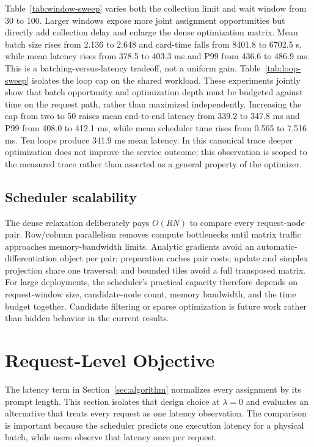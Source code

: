 \documentclass[10pt]{article}
\begin{document}
Table~\ref{tab:window-sweep} varies both the collection limit and wait window
from 30 to 100. Larger windows expose more joint assignment opportunities but
directly add collection delay and enlarge the dense optimization matrix. Mean
batch size rises from 2.136 to 2.648 and card-time falls from 8401.8 to
6702.5 s, while mean latency rises from 378.5 to 403.3 ms and P99 from 436.6
to 486.9 ms. This is a batching-versus-latency tradeoff, not a uniform gain.
Table~\ref{tab:loop-sweep} isolates the loop cap on the shared workload. These
experiments jointly show that batch opportunity and optimization depth must be
budgeted against time on the request path, rather than maximized independently.
Increasing the cap from two to 50 raises mean end-to-end latency from 339.2
to 347.8 ms and P99 from 408.0 to 412.1 ms, while mean scheduler time rises
from 0.565 to 7.516 ms. Ten loops produce 341.9 ms mean latency. In this
canonical trace deeper optimization does not improve the service outcome;
this observation is scoped to the measured trace rather than asserted as a
general property of the optimizer.

\subsection{Scheduler scalability}

The dense relaxation deliberately pays $O(RN)$ to compare every request-node
pair. Row/column parallelism removes compute bottlenecks until matrix traffic
approaches memory-bandwidth limits. Analytic gradients avoid an automatic-
differentiation object per pair; preparation caches pair costs; update and
simplex projection share one traversal; and bounded tiles avoid a full
transposed matrix. For large deployments, the scheduler's practical capacity
therefore depends on request-window size, candidate-node count, memory
bandwidth, and the time budget together. Candidate filtering or sparse
optimization is future work rather than hidden behavior in the current
results.



\clearpage
\section{Request-Level Objective}
\label{sec:request-latency-objective}

The latency term in Section~\ref{sec:algorithm} normalizes every assignment by
its prompt length. This section isolates that design choice at $\lambda=0$ and
evaluates an alternative that treats every request as one latency observation.
The comparison is important because the scheduler predicts one execution
latency for a physical batch, while users observe that latency once per
request.
\end{document}
